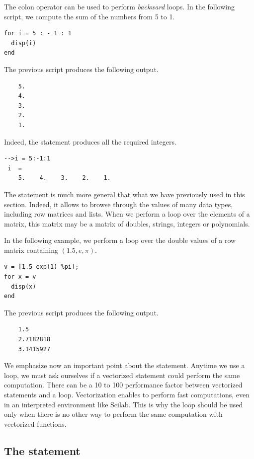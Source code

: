 The colon operator can be used to perform \emph{backward} loops. In the following 
script, we compute the sum of the numbers from 
5 to 1.
\lstset{language=scilabscript}
\begin{lstlisting}
for i = 5 : - 1 : 1
  disp(i)
end
\end{lstlisting}
The previous script produces the following output.
\lstset{language=scilabscript}
\begin{lstlisting}
    5.  
    4.  
    3.  
    2.  
    1.  
\end{lstlisting}
Indeed, the statement  produces all the required integers.
\lstset{language=scilabscript}
\begin{lstlisting}
-->i = 5:-1:1
 i  =
    5.    4.    3.    2.    1.  
\end{lstlisting}

The  statement is much more general that what 
we have previously used in this section. Indeed, it allows to 
browse through the values of many data types, including row matrices 
and lists. When we perform a  loop over the 
elements of a matrix, this matrix may be a matrix of doubles, strings,
integers or polynomials. 

In the following example, we perform a  loop
over the double values of a row matrix containing $(1.5, e , \pi)$.
\lstset{language=scilabscript}
\begin{lstlisting}
v = [1.5 exp(1) %pi];
for x = v
  disp(x)
end
\end{lstlisting}
The previous script produces the following output.
\lstset{language=scilabscript}
\begin{lstlisting}
    1.5  
    2.7182818  
    3.1415927  
\end{lstlisting}

We emphasize now an important point about the  statement.
Anytime we use a  loop, we must ask ourselves 
if a vectorized statement could perform the same computation.
There can be a 10 to 100 performance factor between vectorized 
statements and a  loop. Vectorization enables to perform 
fast computations, even in an interpreted environment like Scilab.
This is why the  loop should be used only when 
there is no other way to perform the same computation with vectorized 
functions.

\subsection{The  statement}

